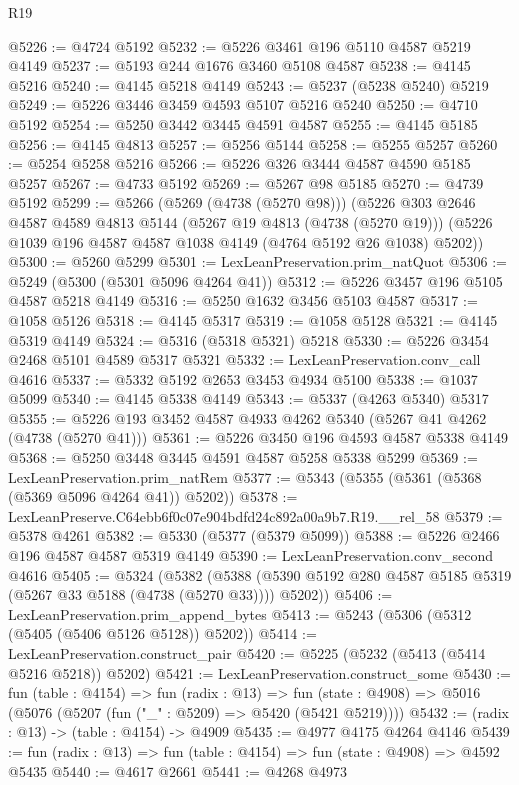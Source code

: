 \begin{lexlean}{R19}
\begin{coremodule}
@5226 := @4724 @5192
@5232 := @5226 @3461 @196 @5110 @4587 @5219 @4149
@5237 := @5193 @244 @1676 @3460 @5108 @4587
@5238 := @4145 @5216
@5240 := @4145 @5218 @4149
@5243 := @5237 (@5238 @5240) @5219
@5249 := @5226 @3446 @3459 @4593 @5107 @5216 @5240
@5250 := @4710 @5192
@5254 := @5250 @3442 @3445 @4591 @4587
@5255 := @4145 @5185
@5256 := @4145 @4813
@5257 := @5256 @5144
@5258 := @5255 @5257
@5260 := @5254 @5258 @5216
@5266 := @5226 @326 @3444 @4587 @4590 @5185 @5257
@5267 := @4733 @5192
@5269 := @5267 @98 @5185
@5270 := @4739 @5192
@5299 := @5266
    (@5269 (@4738 (@5270 @98)))
    (@5226
      @303
      @2646
      @4587
      @4589
      @4813
      @5144
      (@5267 @19 @4813 (@4738 (@5270 @19)))
      (@5226 @1039 @196 @4587 @4587 @1038 @4149 (@4764 @5192 @26 @1038) @5202))
@5300 := @5260 @5299
@5301 := LexLeanPreservation.prim_natQuot
@5306 := @5249 (@5300 (@5301 @5096 @4264 @41))
@5312 := @5226 @3457 @196 @5105 @4587 @5218 @4149
@5316 := @5250 @1632 @3456 @5103 @4587
@5317 := @1058 @5126
@5318 := @4145 @5317
@5319 := @1058 @5128
@5321 := @4145 @5319 @4149
@5324 := @5316 (@5318 @5321) @5218
@5330 := @5226 @3454 @2468 @5101 @4589 @5317 @5321
@5332 := LexLeanPreservation.conv_call @4616
@5337 := @5332 @5192 @2653 @3453 @4934 @5100
@5338 := @1037 @5099
@5340 := @4145 @5338 @4149
@5343 := @5337 (@4263 @5340) @5317
@5355 := @5226 @193 @3452 @4587 @4933 @4262 @5340 (@5267 @41 @4262 (@4738 (@5270 @41)))
@5361 := @5226 @3450 @196 @4593 @4587 @5338 @4149
@5368 := @5250 @3448 @3445 @4591 @4587 @5258 @5338 @5299
@5369 := LexLeanPreservation.prim_natRem
@5377 := @5343 (@5355 (@5361 (@5368 (@5369 @5096 @4264 @41)) @5202))
@5378 := LexLeanPreserve.C64ebb6f0c07e904bdfd24c892a00a9b7.R19.__rel_58
@5379 := @5378 @4261
@5382 := @5330 (@5377 (@5379 @5099))
@5388 := @5226 @2466 @196 @4587 @4587 @5319 @4149
@5390 := LexLeanPreservation.conv_second @4616
@5405 := @5324
    (@5382 (@5388 (@5390 @5192 @280 @4587 @5185 @5319 (@5267 @33 @5188 (@4738 (@5270 @33)))) @5202))
@5406 := LexLeanPreservation.prim_append_bytes
@5413 := @5243 (@5306 (@5312 (@5405 (@5406 @5126 @5128)) @5202))
@5414 := LexLeanPreservation.construct_pair
@5420 := @5225 (@5232 (@5413 (@5414 @5216 @5218)) @5202)
@5421 := LexLeanPreservation.construct_some
@5430 := fun (table : @4154) =>
  fun (radix : @13) =>
  fun (state : @4908) => @5016 (@5076 (@5207 (fun ("_" : @5209) => @5420 (@5421 @5219))))
@5432 := (radix : @13) -> (table : @4154) -> @4909
@5435 := @4977 @4175 @4264 @4146
@5439 := fun (radix : @13) => fun (table : @4154) => fun (state : @4908) => @4592 @5435
@5440 := @4617 @2661
@5441 := @4268 @4973

\end{coremodule}
\end{lexlean}
